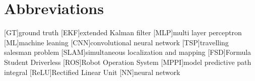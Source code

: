 \chapter{Abbreviations}

\begin{acronym}[AAPC]
	[GT]{ground truth}
	[EKF]{extended Kalman filter}
	[MLP]{multi layer perceptron}
	[ML]{machine leaning}
	[CNN]{convolutional neural network}
	[TSP]{travelling salesman problem}
	[SLAM]{simultaneous localization and mapping}
	[FSD]{Formula Student Driverless}
	[ROS]{Robot Operation System}
	[MPPI]{model predictive path integral}
	[ReLU]{Rectified Linear Unit}
	[NN]{neural network}

\end{acronym}